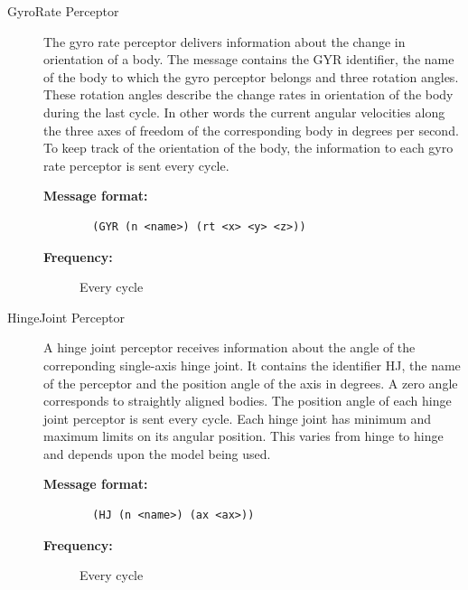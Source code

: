 \begin{description}



  \item [GyroRate Perceptor]
  The gyro rate perceptor delivers information about the change in orientation of a body. The message contains the GYR identifier, the name of the body to which the gyro perceptor belongs and three rotation angles. These rotation angles describe the change rates in orientation of the body during the last cycle. In other words the current angular velocities along the three axes of freedom of the corresponding body in degrees per second. To keep track of the orientation of the body, the information to each gyro rate perceptor is sent every cycle.
  \begin{description}
  \item[{\bf Message format:}]
  \begin{verbatim}
  (GYR (n <name>) (rt <x> <y> <z>))
  \end{verbatim}
  \item[{\bf Frequency:}]
  Every cycle
  \end{description}




  \item [HingeJoint Perceptor]
  A hinge joint perceptor receives information about the angle of the correponding single-axis hinge joint. It contains the identifier HJ, the name of the perceptor and the position angle of the axis in degrees. A zero angle corresponds to straightly aligned bodies. The position angle of each hinge joint perceptor is sent every cycle.
Each hinge joint has minimum and maximum limits on its angular position. This varies from hinge to hinge and depends upon the model being used.  \begin{description}
  \item[{\bf Message format:}]
  \begin{verbatim}
  (HJ (n <name>) (ax <ax>))
  \end{verbatim}
  \item[{\bf Frequency:}]
  Every cycle
  \end{description}
  
  
  

\end{description}
